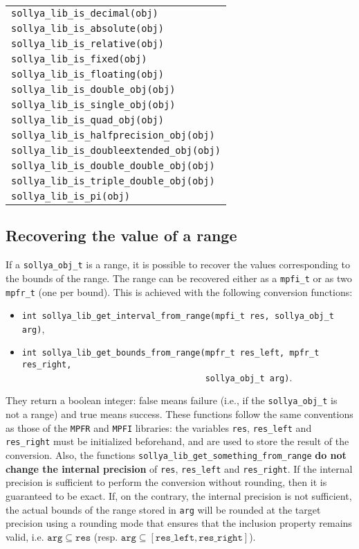 \documentclass[a4paper]{article}
\begin{document}
\begin{table}[htp]
\begin{center}
\begin{tabular}{|l|}
      \verb|sollya_lib_is_decimal(obj)| \\
      \verb|sollya_lib_is_absolute(obj)| \\
      \verb|sollya_lib_is_relative(obj)| \\
      \verb|sollya_lib_is_fixed(obj)| \\
      \verb|sollya_lib_is_floating(obj)| \\
      \verb|sollya_lib_is_double_obj(obj)| \\
      \verb|sollya_lib_is_single_obj(obj)| \\
      \verb|sollya_lib_is_quad_obj(obj)| \\
      \verb|sollya_lib_is_halfprecision_obj(obj)| \\
      \verb|sollya_lib_is_doubleextended_obj(obj)| \\
      \verb|sollya_lib_is_double_double_obj(obj)| \\
      \verb|sollya_lib_is_triple_double_obj(obj)| \\
      \verb|sollya_lib_is_pi(obj)| \\
      \hline
  \end{tabular}
\end{center}
\end{table}

\subsection{Recovering the value of a range}
If a \verb|sollya_obj_t| is a range, it is possible to recover the values corresponding to the bounds of the range. The range can be recovered either as a \verb|mpfi_t| or as two \verb|mpfr_t| (one per bound). This is achieved with the following conversion functions:
\begin{itemize}
\item \verb|int sollya_lib_get_interval_from_range(mpfi_t res, sollya_obj_t arg)|,
\item \verb|int sollya_lib_get_bounds_from_range(mpfr_t res_left, mpfr_t res_right,|\\
      \verb|                                     sollya_obj_t arg)|.
\end{itemize}
They return a boolean integer: false means failure (i.e., if the \verb|sollya_obj_t| is not a range) and true means success. These functions follow the same conventions as those of the \verb|MPFR| and \verb|MPFI| libraries: the variables \verb|res|, \verb|res_left| and \verb|res_right| must be initialized beforehand, and are used to store the result of the conversion. Also, the functions \verb|sollya_lib_get_something_from_range| \textbf{do not change the internal precision} of \verb|res|, \verb|res_left| and \verb|res_right|. If the internal precision is sufficient to perform the conversion without rounding, then it is guaranteed to be exact. If, on the contrary, the internal precision is not sufficient, the actual bounds of the range stored in \verb|arg| will be rounded at the target precision using a rounding mode that ensures that the inclusion property remains valid, i.e. $\mathtt{arg} \subseteq \mathtt{res}$ (resp. $\mathtt{arg} \subseteq [\mathtt{res\_left}, \mathtt{res\_right}]$).
\end{document}
